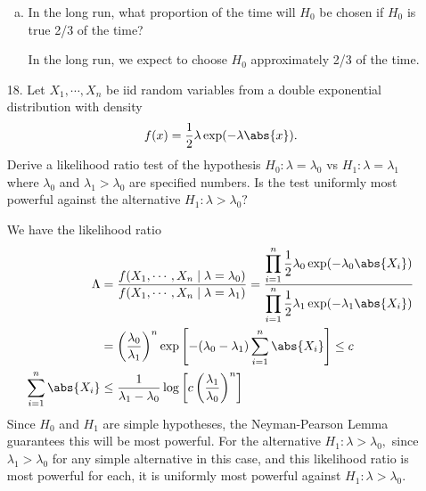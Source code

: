 \documentclass{article}
\begin{document}
\begin{itemize}
\begin{enumerate}[a.]
			\item In the long run, what proportion of the time will $H_0$ be chosen if $H_0$ is true 2/3 of the time?
				\begin{answer*}
					In the long run, we expect to choose $H_0$ approximately 2/3 of the time.
				\end{answer*}
				
		\end{enumerate}

	\item[18.] Let $X_1, \cdots, X_n$ be iid random variables from a double exponential distribution with density \[f(x)=\frac{1}{2}\lambda \exp(-\lambda\abs{x}).\] Derive a likelihood ratio test of the hypothesis $H_0:\lambda=\lambda_0$ vs $H_1:\lambda=\lambda_1$ where $\lambda_0$ and $\lambda_1>\lambda_0$ are specified numbers. Is the test uniformly most powerful against the alternative $H_1:\lambda>\lambda_0?$
		\begin{soln}
			We have the likelihood ratio
			\begin{align*}
				\Lambda &= \frac{f(X_1, \cdots, X_n\mid \lambda=\lambda_0)}{f(X_1, \cdots, X_n\mid \lambda=\lambda_1)} = \frac{\displaystyle\prod_{i=1}^{n} \frac{1}{2}\lambda_0 \exp(-\lambda_0\abs{X_i})}{\displaystyle\prod_{i=1}^{n} \frac{1}{2}\lambda_1 \exp(-\lambda_1\abs{X_i})} \\
				&= \left( \frac{\lambda_0}{\lambda_1} \right)^n \exp\left[ -(\lambda_0-\lambda_1)\sum_{i=1}^{n} \abs{X_i} \right] \le c \\
				\sum_{i=1}^{n}\abs{X_i} &\le \frac{1}{\lambda_1-\lambda_0}\log\left[ c\left( \frac{\lambda_1}{\lambda_0} \right)^n \right]
			\end{align*}
			Since $H_0$ and $H_1$ are simple hypotheses, the Neyman-Pearson Lemma guarantees this will be most powerful. For the alternative $H_1:\lambda>\lambda_0,$ since $\lambda_1>\lambda_0$ for any simple alternative in this case, and this likelihood ratio is most powerful for each, it is uniformly most powerful against $H_1:\lambda>\lambda_0.$
			
		\end{soln}


\end{itemize}
\end{document}
